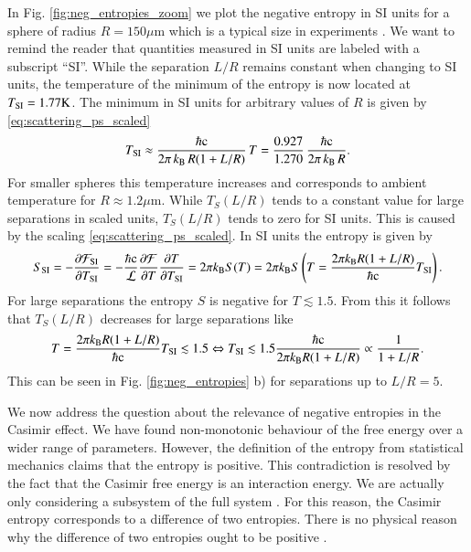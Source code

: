 In Fig. \ref{fig:neg_entropies_zoom} we plot the negative entropy in SI units
for a sphere of radius $R=150\mu\mathrm{m}$ which is a typical size in experiments \cite{2012IJMPA2760013L}.
We want to remind the reader that
quantities measured in SI units are labeled with a subscript ``SI''.
While the separation
$L/R$ remains constant when changing to SI units, the temperature of the
minimum of the entropy is now located at $T_{\text{SI}} = 1.77\mathrm{K}$. The minimum in
SI units for arbitrary values of $R$ is given by
\eqref{eq:scattering_ps_scaled}
\begin{equation}
T_{\text{SI}} \approx \frac{\hbar \mathrm{c}}{2\pi \, k_\text{B} \, R(1+L/R)} \, T = \frac{0.927}{1.270} \, \frac{\hbar \mathrm{c}}{2\pi \, k_\text{B} \, R}.
\end{equation}
For smaller spheres this temperature increases and corresponds to ambient
temperature for $R\approx1.2\mu\mathrm{m}$. While $T_S(L/R)$
tends to a constant value for large separations in scaled
units, $T_S(L/R)$ tends to zero for SI units. This is caused by the
scaling \eqref{eq:scattering_ps_scaled}. In SI units the entropy is given by
\begin{equation}
S_{\text{SI}} = - \frac{\partial \mathcal{F}_{\text{SI}}}{\partial T_{\text{SI}}} = -\frac{\hbar\mathrm{c}}{\mathcal{L}} \frac{\partial\mathcal{F}}{\partial T} \frac{\partial T}{\partial T_{\text{SI}}}
= 2\pi k_\text{B} S(T) = 2\pi k_\text{B} S\left(T = \frac{2\pi k_\text{B} R (1+L/R)}{\hbar\mathrm{c}}T_{\text{SI}}\right).
\end{equation}
For large separations the entropy $S$ is negative for $T\lesssim1.5$. From this
it follows that $T_S(L/R)$ decreases for large separations like
\begin{equation}
T = \frac{2\pi k_\text{B} R (1+L/R)}{\hbar\mathrm{c}} T_{\text{SI}} \lesssim 1.5 \\
\Leftrightarrow \\
T_{\text{SI}} \lesssim 1.5 \frac{\hbar\mathrm{c}}{2\pi k_\text{B} R (1+L/R)} \propto \frac{1}{1+L/R}.
\end{equation}
This can be seen in Fig. \ref{fig:neg_entropies} b) for separations up to $L/R=5$.

We now address the question about the relevance of negative entropies in the
Casimir effect. We have found non-monotonic behaviour of the free energy over
a wider range of parameters. However, the definition of the entropy from
statistical mechanics claims that the entropy is positive. This contradiction
is resolved by the fact that the Casimir free energy is an interaction energy.
We are actually only considering a subsystem of the full system
\cite{1367-2630-8-10-236}. For this reason, the Casimir entropy corresponds to
a difference of two entropies. There is no physical reason why the difference
of two entropies ought to be positive \cite{2009PhRvE80d1113I,
2010IJMPA25.2313P}.
